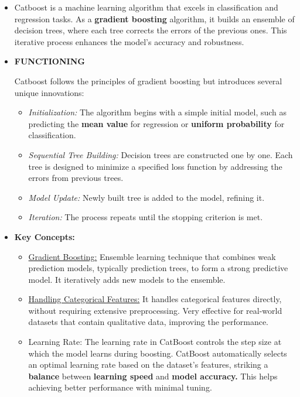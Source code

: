 \documentclass[
  letterpaper,
  DIV=11,
  numbers=noendperiod]{scrartcl}
\begin{document}
\begin{itemize}
\item
  Catboost is a machine learning algorithm that excels in classification
  and regression tasks. As a \textbf{gradient boosting} algorithm, it
  builds an ensemble of decision trees, where each tree corrects the
  errors of the previous ones. This iterative process enhances the
  model's accuracy and robustness.
\item
  \textbf{FUNCTIONING}

  Catboost follows the principles of gradient boosting but introduces
  several unique innovations:

  \begin{itemize}
  \item
    \emph{Initialization:} The algorithm begins with a simple initial
    model, such as predicting the \textbf{mean value} for regression or
    \textbf{uniform probability} for classification.
  \item
    \emph{Sequential Tree Building:} Decision trees are constructed one
    by one. Each tree is designed to minimize a specified loss function
    by addressing the errors from previous trees.
  \item
    \emph{Model Update:} Newly built tree is added to the model,
    refining it.
  \item
    \emph{Iteration:} The process repeats until the stopping criterion
    is met.
  \end{itemize}
\item
  \textbf{Key Concepts:}

  \begin{itemize}
  \item
    \ul{Gradient Boosting:} Ensemble learning technique that combines
    weak prediction models, typically prediction trees, to form a strong
    predictive model. It iteratively adds new models to the ensemble.
  \item
    \ul{Handling Categorical Features:} It handles categorical features
    directly, without requiring extensive preprocessing. Very effective
    for real-world datasets that contain qualitative data, improving the
    performance.
  \item
    Learning Rate: The learning rate in CatBoost controls the step size
    at which the model learns during boosting. CatBoost automatically
    selects an optimal learning rate based on the dataset's features,
    striking a \textbf{balance} between \textbf{learning speed} and
    \textbf{model accuracy.} This helps achieving better performance
    with minimal tuning.
  \end{itemize}


\end{itemize}
\end{document}
